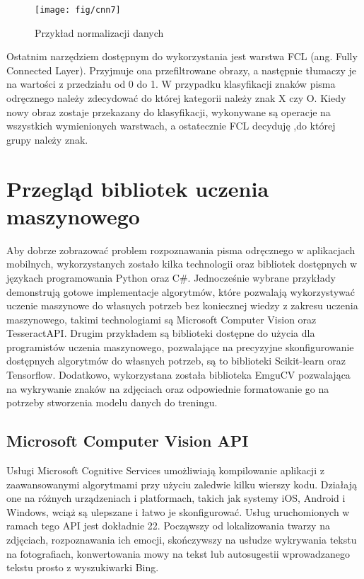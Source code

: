 \documentclass[brudnopis]{xmgr}
\begin{document}
\begin{figure}[!tbh]
\centering
\texttt{[image: fig/cnn7]}
\caption{Przykład normalizacji danych}
\end{figure}
\newpage

Ostatnim narzędziem dostępnym do wykorzystania jest warstwa FCL (ang. Fully Connected Layer). Przyjmuje ona przefiltrowane obrazy, a następnie tłumaczy je na wartości z przedziału od 0 do 1. W przypadku klasyfikacji znaków pisma odręcznego należy zdecydować do której kategorii należy znak X czy O. Kiedy nowy obraz zostaje przekazany do klasyfikacji, wykonywane są operacje na wszystkich wymienionych warstwach, a ostatecznie FCL decyduję ,do której grupy należy znak.

\chapter{Przegląd bibliotek uczenia maszynowego}
Aby dobrze zobrazować problem rozpoznawania pisma odręcznego w aplikacjach mobilnych, wykorzystanych zostało kilka technologii oraz bibliotek dostępnych w językach programowania Python oraz C\#. Jednocześnie wybrane przykłady demonstrują gotowe implementacje algorytmów, które pozwalają wykorzystywać uczenie maszynowe do własnych potrzeb bez koniecznej wiedzy z zakresu uczenia maszynowego, takimi technologiami są Microsoft Computer Vision oraz TesseractAPI. Drugim przykładem są biblioteki dostępne do użycia dla programistów uczenia maszynowego, pozwalające na precyzyjne skonfigurowanie dostępnych algorytmów do własnych potrzeb, są to biblioteki Scikit-learn oraz Tensorflow. Dodatkowo, wykorzystana została biblioteka EmguCV pozwalająca na wykrywanie znaków na zdjęciach oraz odpowiednie formatowanie go na potrzeby stworzenia modelu danych do treningu.

\section{Microsoft Computer Vision API}

Usługi Microsoft Cognitive Services umożliwiają kompilowanie aplikacji z zaawansowanymi algorytmami przy użyciu zaledwie kilku wierszy kodu. Działają one na różnych urządzeniach i platformach, takich jak systemy iOS, Android i Windows, wciąż są ulepszane i łatwo je skonfigurować. Usług uruchomionych w ramach tego API jest dokładnie 22. Począwszy od lokalizowania twarzy na zdjęciach, rozpoznawania ich emocji, skończywszy na usłudze wykrywania tekstu na fotografiach, konwertowania mowy na tekst lub autosugestii wprowadzanego tekstu prosto z wyszukiwarki Bing.
\end{document}
